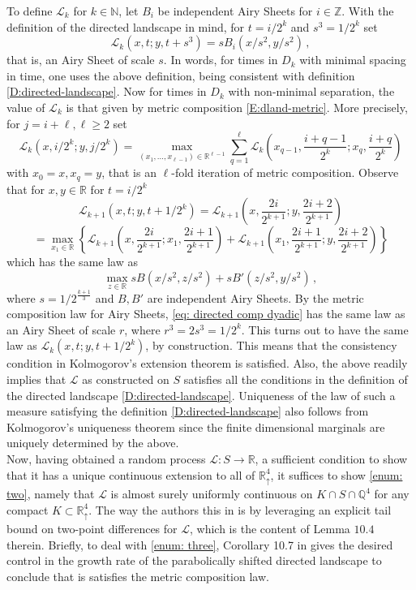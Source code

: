 \documentclass[12pt]{report}
\theoremstyle{plain}
\newcommand{\N}{\ensuremath{\mathbb{N}}}
\newcommand{\R}{\ensuremath{\mathbb{R}}}
\newcommand{\Z}{\ensuremath{\mathbb{Z}}}
\newcommand{\Q}{\ensuremath{\mathbb{Q}}}
\begin{document}
To define \(\mathcal{L}_k\) for \(k\in \N\), let \(B_i\) be independent Airy Sheets for \(i\in\Z\). With the definition of the directed landscape in mind, for \(t = i/2^k\) and \(s^3 = 1/2^k\) set
\[
\mathcal{L}_k(x,t;y,t+s^3) = sB_i(x/s^2, y/s^2)\,,
\]
that is, an Airy Sheet of scale \(s\). In words, for times in \(D_k\) with minimal spacing in time, one uses the above definition, being consistent with definition \ref{D:directed-landscape}. Now for times in \(D_k\) with non-minimal separation, the value of \(\mathcal{L}_k\) is that given by metric composition \ref{E:dland-metric}. More precisely, for \(j = i+\ell, \ell\geq 2\) set 
\begin{equation}\label{eq: directed comp dyadic}
\mathcal{L}_k(x,i/2^k;y, j/2^k) = \max_{(x_1,\dots, x_{\ell-1})\in\R^{\ell-1}}\displaystyle\sum_{q=1}^\ell \mathcal{L}_k\left(x_{q-1},\frac{i+q-1}{2^k};x_q, \frac{i+q}{2^k}\right)
\end{equation}
with \(x_0 = x, x_q = y\), that is an \(\ell\)-fold iteration of metric composition. Observe that for \(x,y\in \R\) for \(t = i/2^k\)
\[
\mathcal{L}_{k+1}\left(x,t;y, t+1/2^k\right) = \mathcal{L}_{k+1}\left(x,\frac{2i}{2^{k+1}};y, \frac{2i+2}{2^{k+1}}\right)\]
\[
= \max_{x_1\in\R}\left\{\displaystyle \mathcal{L}_{k+1}\left(x,\frac{2i}{2^{k+1}};x_1, \frac{2i+1}{2^{k+1}}\right)+\mathcal{L}_{k+1}\left(x_1,\frac{2i+1}{2^{k+1}};y, \frac{2i+2}{2^{k+1}}\right)\right\}
\]
which has the same law as 
\[
\max_{z\in\R}\displaystyle sB(x/s^2, z/s^2)+sB'(z/s^2, y/s^2)\,,
\]
where \(s = 1/2^{\frac{k+1}{3}}\) and \(B, B'\) are independent Airy Sheets. By the metric composition law for Airy Sheets, \ref{eq: directed comp dyadic} has the same law as an Airy Sheet of scale \(r\), where \(r^3 = 2s^3 = 1/2^k\). This turns out to have the same law as \(\mathcal{L}_{k}\left(x,t;y, t+1/2^k\right)\), by construction. This means that the consistency condition in Kolmogorov's extension theorem is satisfied. Also, the above readily implies that \(\mathcal{L}\) as constructed on \(S\) satisfies all the conditions in the definition of the directed landscape \ref{D:directed-landscape}. Uniqueness of the law of such a measure satisfying the definition \ref{D:directed-landscape} also follows from Kolmogorov's uniqueness theorem since the finite dimensional marginals are uniquely determined by the above.\\

Now, having obtained a random process \(\mathcal{L}:S\to \R\), a sufficient condition to show that it has a unique continuous extension to all of \(\R^4_\uparrow\), it suffices to show \ref{enum: two}, namely that \(\mathcal{L}\) is almost surely uniformly continuous on \(K\cap S\cap\Q^4\) for any compact \(K\subset \R^4_\uparrow\). The way the authors this in \cite{DOV} is by leveraging an explicit tail bound on two-point differences for 
\(\mathcal{L}\), which is the content of Lemma \(10.4\) therein. Briefly, to deal with \ref{enum: three}, Corollary 10.7 in \cite{DOV} gives the desired control in the growth rate of the parabolically shifted directed landscape to conclude that is satisfies the metric composition law.\\
\end{document}
